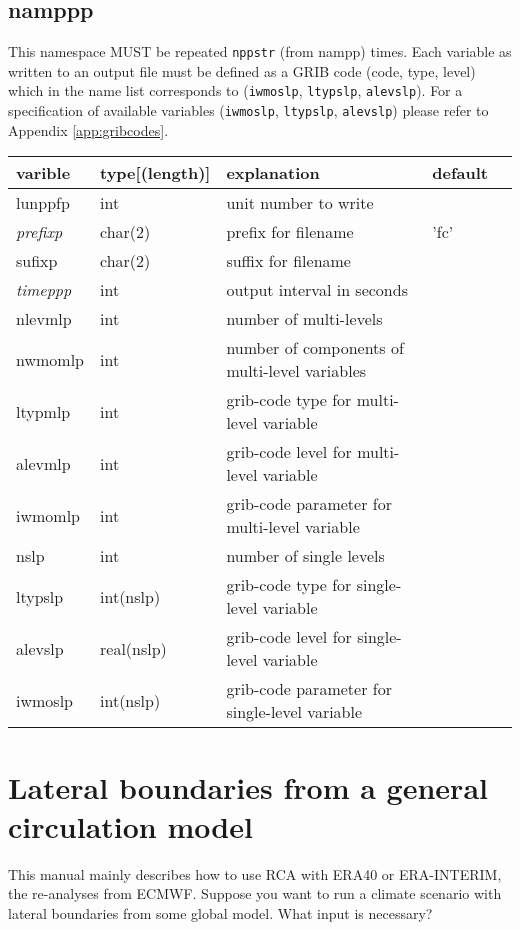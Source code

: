 \documentclass{article}
\begin{document}
\subsection{namppp}
This namespace MUST be repeated \verb+nppstr+ (from nampp) times.
Each variable as written to an output file must be defined as a GRIB code (code, type, level)
which in the name list corresponds to (\verb+iwmoslp+, \verb+ltypslp+, \verb+alevslp+).
For a specification of available variables (\verb+iwmoslp+, \verb+ltypslp+, \verb+alevslp+) please refer to
Appendix \ref{app:gribcodes}.

\begin{tabular}{|l|l|l|l|l|}
  \hline
  varible & type[(length)] & explanation & default\\
  \hline
  \hline
  lunppfp & int &  unit number to write & \\
  \emph{prefixp} & char(2) & prefix for filename & 'fc' \\
  sufixp & char(2) &  suffix for filename & \\
  \emph{timeppp} & int &  output interval in seconds & \\
  nlevmlp & int & number of multi-levels  & \\
  nwmomlp & int & number of components of multi-level variables   & \\
  ltypmlp & int & grib-code  type for multi-level variable & \\
  alevmlp & int & grib-code level for multi-level variable & \\
  iwmomlp & int &  grib-code parameter for multi-level variable & \\
  nslp & int  & number of single levels & \\
  ltypslp & int(nslp) &  grib-code  type for single-level variable  & \\
  alevslp & real(nslp) &  grib-code level for single-level variable & \\
  iwmoslp & int(nslp) &  grib-code parameter for single-level variable  & \\
 \hline
\end{tabular}


\section{Lateral boundaries from a general circulation model}

This manual mainly describes how to use RCA with ERA40 or ERA-INTERIM, 
the re-analyses from ECMWF.
Suppose you want to run a climate scenario with lateral boundaries
from some global model. What input is necessary?
\end{document}

